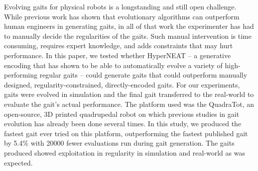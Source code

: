 Evolving gaits for physical robots is a longstanding and still open challenge. 
While previous work has shown that evolutionary algorithms can outperform human engineers in generating gaits, in all of that work the experimenter has had to manually decide the regularities of the gaits. 
Such manual intervention is time consuming, requires expert knowledge, and adds constraints that may hurt performance. 
In this paper, we tested whether HyperNEAT -- a generative encoding that has shown to be able to automatically evolve a variety of high-performing regular gaits -- could generate gaits that could outperform manually designed, regularity-constrained, directly-encoded gaits. 
For our experiments, gaits were evolved in simulation and the final gait transferred to the real-world to evaluate the gait's actual performance.
The platform used was the QuadraTot, an open-source, 3D printed quadrupedal robot on which previous studies in gait evolution has already been done several times. 
In this study, we produced the fastest gait ever tried on this platform, outperforming the fastest published gait by 5.4\% with 20000 fewer evaluations run during gait generation. 
The gaits produced showed exploitation in regularity in simulation and real-world as was expected.
